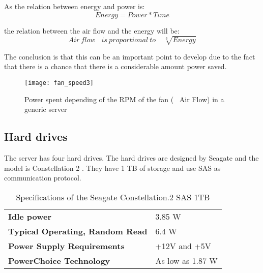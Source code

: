 As the relation between energy and power is:
\begin{equation*}\label{eq:2}
Energy  = Power * Time
\end{equation*}

the relation between the air flow and the energy will be:
\begin{equation*}\label{eq:3}
Air\ flow\ \ \ \ is\ proportional\ to\ \ \ \ \ \sqrt[3] {Energy}
\end{equation*}

The conclusion is that this can be an important point to develop due to the fact that there is a chance that there is a considerable amount power saved. 

\begin{figure}[H]
\begin{center}
\texttt{[image: fan\_speed3]} %
\caption{Power spent depending of the RPM of the fan (~ Air Flow) in a generic server}
\label{fig:fan_speed} %
\end{center}
\end{figure}





    
    \subsection{Hard drives}
    

The server has four hard drives. The hard drives are designed by Seagate and the model is Constellation 2 \cite{diskDatasheet}. They have 1 TB of storage and use SAS as communication protocol.
    
\begin{table}[H]
\begin{center}
\begin{tabular}{p{8cm} p{3cm}}
  \hline
  \bf Idle power & 3.85 W \\
  \bf Typical Operating, Random Read & 6.4 W \\
  \bf Power Supply Requirements & +12V and +5V  \\
  \bf PowerChoice Technology & As low as 1.87 W  \\ 
  \hline
\end{tabular}
\end{center}
\caption{Specifications of the Seagate Constellation.2 SAS 1TB}
\label{tab:disk_spec}
\end{table}
    
